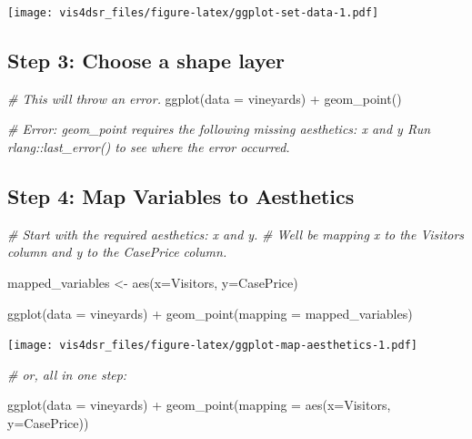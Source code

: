 \documentclass[
]{krantz}
\makeatletter
\newenvironment{Shaded}{\begin{snugshade}}{\end{snugshade}}
\newcommand{\AttributeTok}[1]{\textcolor[rgb]{0.61,0.61,0.61}{#1}}
\newcommand{\CommentTok}[1]{\textcolor[rgb]{0.37,0.37,0.37}{\textit{#1}}}
\newcommand{\FunctionTok}[1]{\textcolor[rgb]{0,0,0}{#1}}
\newcommand{\NormalTok}[1]{#1}
\newcommand{\OtherTok}[1]{\textcolor[rgb]{0.37,0.37,0.37}{#1}}
\newcommand{\SpecialCharTok}[1]{\textcolor[rgb]{0,0,0}{#1}}
\newenvironment{kframe}{%
\medskip{}
\setlength{\fboxsep}{.8em}
 \def\at@end@of@kframe{}%
 \ifinner\ifhmode%
  \def\at@end@of@kframe{\end{minipage}}%
  \begin{minipage}{\columnwidth}%
 \fi\fi%
 \def\FrameCommand##1{\hskip\@totalleftmargin \hskip-\fboxsep
 \colorbox{shadecolor}{##1}\hskip-\fboxsep
     \hskip-\linewidth \hskip-\@totalleftmargin \hskip\columnwidth}%
 \MakeFramed {\advance\hsize-\width
   \@totalleftmargin\z@ \linewidth\hsize
   \@setminipage}}%
 {\par\unskip\endMakeFramed%
 \at@end@of@kframe}
\renewenvironment{Shaded}{\begin{kframe}}{\end{kframe}}
\makeatother
\begin{document}
\texttt{[image: vis4dsr\_files/figure-latex/ggplot-set-data-1.pdf]}

\hypertarget{step-3-choose-a-shape-layer}{%
\subsection{Step 3: Choose a shape layer}\label{step-3-choose-a-shape-layer}}

\begin{Shaded}
\begin{Highlighting}[]
\CommentTok{\# This will throw an error.}
\FunctionTok{ggplot}\NormalTok{(}\AttributeTok{data =}\NormalTok{ vineyards) }\SpecialCharTok{+}
  \FunctionTok{geom\_point}\NormalTok{()}

\CommentTok{\# Error: geom\_point requires the following missing aesthetics: x and y Run \textasciigrave{}rlang::last\_error()\textasciigrave{} to see where the error occurred.}
\end{Highlighting}
\end{Shaded}

\hypertarget{step-4-map-variables-to-aesthetics}{%
\subsection{Step 4: Map Variables to Aesthetics}\label{step-4-map-variables-to-aesthetics}}

\begin{Shaded}
\begin{Highlighting}[]
\CommentTok{\# Start with the required aesthetics: x and y.}
\CommentTok{\# We\textquotesingle{}ll be mapping x to the Visitors column and y to the CasePrice column.}

\NormalTok{mapped\_variables }\OtherTok{\textless{}{-}} \FunctionTok{aes}\NormalTok{(}\AttributeTok{x=}\NormalTok{Visitors, }\AttributeTok{y=}\NormalTok{CasePrice)}

\FunctionTok{ggplot}\NormalTok{(}\AttributeTok{data =}\NormalTok{ vineyards) }\SpecialCharTok{+}
  \FunctionTok{geom\_point}\NormalTok{(}\AttributeTok{mapping =}\NormalTok{ mapped\_variables)}
\end{Highlighting}
\end{Shaded}

\texttt{[image: vis4dsr\_files/figure-latex/ggplot-map-aesthetics-1.pdf]}

\begin{Shaded}
\begin{Highlighting}[]
\CommentTok{\# or, all in one step:}

\FunctionTok{ggplot}\NormalTok{(}\AttributeTok{data =}\NormalTok{ vineyards) }\SpecialCharTok{+}
  \FunctionTok{geom\_point}\NormalTok{(}\AttributeTok{mapping =} \FunctionTok{aes}\NormalTok{(}\AttributeTok{x=}\NormalTok{Visitors, }\AttributeTok{y=}\NormalTok{CasePrice))}
\end{Highlighting}
\end{Shaded}
\end{document}
